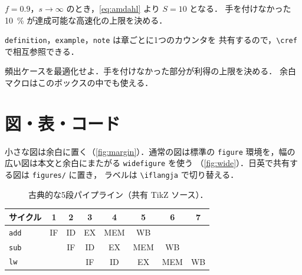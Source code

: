 \documentclass[../main.tex]{subfiles}
\begin{document}
\begin{example}
  $f = 0.9$，$s \to \infty$ のとき，\cref{eq:amdahl} より $S = 10$ となる．
  手を付けなかった \SI{10}{\percent} が達成可能な高速化の上限を決める．
\end{example}

\begin{note}
  \verb|definition|，\verb|example|，\verb|note| は章ごとに1つのカウンタを
  共有するので，\verb|\cref| で相互参照できる．
\end{note}

\begin{keypoint}
  頻出ケースを最適化せよ．手を付けなかった部分が利得の上限を決める．
  余白マクロはこのボックスの中でも使える．
\end{keypoint}

\section{図・表・コード}

\begin{marginfigure}
  \caption{余白に置いた図（\texttt{marginfigure}）．}
  \label{fig:margin}
\end{marginfigure}

小さな図は余白に置く（\cref{fig:margin}）．通常の図は標準の \verb|figure|
環境を，幅の広い図は本文と余白にまたがる \verb|widefigure| を使う
（\cref{fig:wide}）．日英で共有する図は \texttt{figures/} に置き，
ラベルは \verb|\iflangja| で切り替える．

\begin{figure}[htbp]
  \centering
  
  \caption{古典的な5段パイプライン（共有 TikZ ソース）．}
  \label{fig:pipeline}
\end{figure}

\begin{widefigure}[htbp]
  \begin{tabular}{@{}lccccccc@{}}
    \toprule
    サイクル & 1 & 2 & 3 & 4 & 5 & 6 & 7 \\
    \midrule
    \texttt{add}  & IF & ID & EX & MEM & WB &    &    \\
    \texttt{sub}  &    & IF & ID & EX  & MEM & WB &   \\
    \texttt{lw}   &    &    & IF & ID  & EX  & MEM & WB \\
    \bottomrule
  \end{tabular}
  \caption{本文と余白にまたがる幅広フロート（\texttt{widefigure}）．}
  \label{fig:wide}
\end{widefigure}
\end{document}
